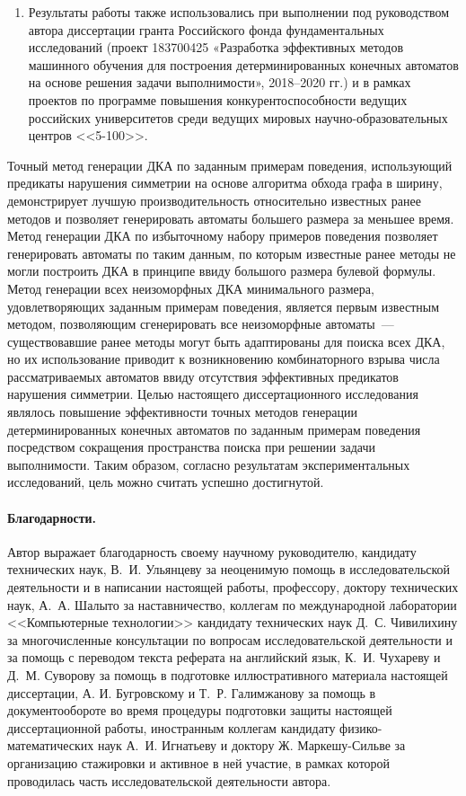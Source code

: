 \begin{enumerate}
  \item Результаты работы также использовались при выполнении под руководством автора диссертации гранта Российского фонда фундаментальных исследований (проект 18­37­00425 «Разработка эффективных методов машинного обучения для построения детерминированных конечных автоматов на основе решения задачи выполнимости», 2018–2020 гг.) и в рамках проектов по программе повышения конкурентоспособности ведущих российских университетов среди ведущих мировых научно-образовательных центров <<5-100>>.

\end{enumerate}

Точный метод генерации ДКА по заданным примерам поведения, использующий предикаты нарушения симметрии на основе алгоритма обхода графа в ширину, демонстрирует лучшую производительность относительно известных ранее методов и позволяет генерировать автоматы большего размера за меньшее время.
Метод генерации ДКА по избыточному набору примеров поведения позволяет генерировать автоматы по таким данным, по которым известные ранее методы не могли построить ДКА в принципе ввиду большого размера булевой формулы.
Метод генерации всех неизоморфных ДКА минимального размера, удовлетворяющих заданным примерам поведения, является первым известным методом, позволяющим сгенерировать все неизоморфные автоматы~--- существовавшие ранее методы могут быть адаптированы для поиска всех ДКА, но их использование приводит к возникновению комбинаторного взрыва числа рассматриваемых автоматов ввиду отсутствия эффективных предикатов нарушения симметрии.
Целью настоящего диссертационного исследования являлось повышение эффективности точных методов генерации детерминированных конечных автоматов по заданным примерам поведения посредством сокращения пространства поиска при решении задачи выполнимости.
Таким образом, согласно результатам экспериментальных исследований, цель можно считать успешно достигнутой.

\paragraph*{Благодарности.}
Автор выражает благодарность своему научному руководителю, кандидату технических наук, В.~И. Ульянцеву за неоценимую помощь в исследовательской деятельности и в написании настоящей работы, профессору, доктору технических наук, А.~А. Шалыто за наставничество, коллегам по международной лаборатории <<Компьютерные технологии>> кандидату технических наук Д.~С. Чивилихину за многочисленные консультации по вопросам исследовательской деятельности и за помощь с переводом текста реферата на английский язык, К.~И. Чухареву и Д.~М. Суворову за помощь в подготовке иллюстративного материала настоящей диссертации, А. И. Бугровскому и Т.~Р. Галимжанову за помощь в документообороте во время процедуры подготовки защиты настоящей диссертационной работы, иностранным коллегам кандидату физико-математических наук А.~И. Игнатьеву и доктору Ж. Маркешу-Сильве за организацию стажировки и активное в ней участие, в рамках которой проводилась часть исследовательской деятельности автора.

